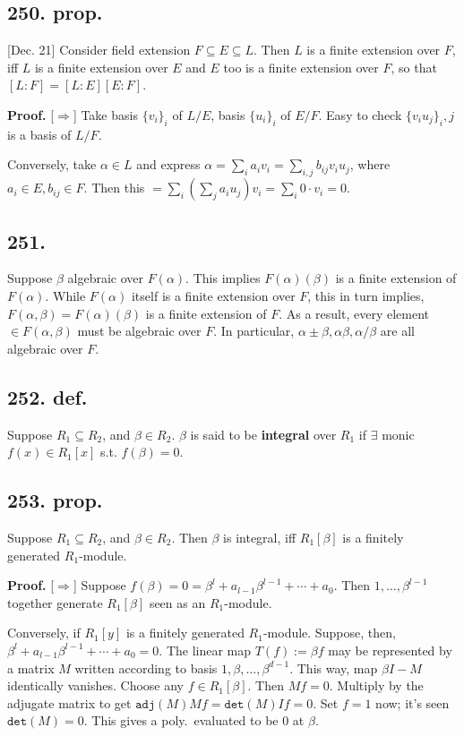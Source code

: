 \documentclass[12pt]{article}
\newcommand\aG\alpha \newcommand\bG\beta  \newcommand\gG\gamma \newcommand\dG\delta \newcommand\eG\varepsilon \newcommand\zG\zeta \newcommand\tG\vartheta \newcommand\kG\kappa \newcommand\lG\lambda \newcommand\sG\sigma \newcommand\fG\varphi \newcommand\oG\omega
\newcommand{\M}\cdot%
\newcommand{\Ex}\exists%
\newcommand{\Ip}{\Rightarrow} %
\newcommand{\Rb}[1]{ \left( #1 \right) }%
\newcommand{\Ss}[1]{\textsf{\bfseries{#1}}}%
\newcommand{\Tw}[1]{\texttt{#1}}%
\begin{document}
\subsection*{250. prop.} [Dec. 21] Consider field extension \(F \subseteq E \subseteq L\). 
Then \(L\) is a finite extension over \(F\), iff \(L\) is a finite extension over \(E\) and \(E\) too is a finite extension over \(F\), so that \([L:F] =[L:E] [E:F]\). \par
\Ss{Proof.} [\(\Ip\)] Take basis \(\{v_i\}_i\) of \(L/E\), basis \(\{u_i\}_i\) of \(E/F\). 
Easy to check \(\{v_i u_j\}_i,j\) is a basis of \(L/F\). \par
[\(\Leftarrow\)] Conversely, take \(\aG \in L\) and express \(\aG =\sum_i a_i v_i = \sum_{i,j} b_{ij} v_i u_j\), where \(a_i \in E, b_{ij} \in F\). 
Then this \(=\sum_i \Rb{\sum_j a_i u_j} v_i =\sum_i 0 \M v_i =0\). 

\subsection*{251.} Suppose \(\bG\) algebraic over \(F(\aG)\). 
This implies \(F(\aG)(\bG)\) is a finite extension of \(F(\aG)\). 
While \(F(\aG)\) itself is a finite extension over \(F\), this in turn implies, \(F(\aG,\bG) =F(\aG)(\bG)\) is a finite extension of \(F\). 
As a result, every element \(\in F(\aG,\bG)\) must be algebraic over \(F\). 
In particular, \(\aG \pm \bG, \aG\bG, \aG/\bG\) are all algebraic over \(F\). 

\subsection*{252. def.} Suppose \(R_1 \subseteq R_2\), and \(\bG \in R_2\). 
\(\bG\) is said to be \Ss{integral} over \(R_1\) if \(\Ex\) monic \(f(x) \in R_1 [x]\) s.t. \(f(\bG) =0\). 

\subsection*{253. prop.} Suppose \(R_1 \subseteq R_2\), and \(\bG \in R_2\). 
Then \(\bG\) is integral, iff \(R_1[\bG]\) is a finitely generated \(R_1\)-module. \par
\Ss{Proof.} [\(\Ip\)] Suppose \(f(\bG) =0 =\bG^l +a_{l-1} \bG^{l-1} +\dotsb+ a_0\). 
Then \(1,\dotsc,\bG^{l-1}\) together generate \(R_1[\bG]\) seen as an \(R_1\)-module. \par
[\(\Leftarrow\)] Conversely, if \(R_1[y]\) is a finitely generated \(R_1\)-module. 
Suppose, then, \(\bG^l +a_{l-1} \bG^{l-1} +\dotsb+ a_0 =0\). 
The linear map \(T(f) :=\bG f\) may be represented by a matrix \(M\) written according to basis \(1,\bG,\dotsc,\bG^{d-1}\). 
This way, map \(\bG I -M\) identically vanishes. 
Choose any \(f \in R_1[\bG]\). Then \(Mf =0\). 
Multiply by the adjugate matrix to get \(\Tw{adj}(M)Mf =\Tw{det}(M)If =0\). 
Set \(f=1\) now; it's seen \(\Tw{det}(M) =0\). This gives a poly.\ evaluated to be 0 at \(\bG\). 
\end{document}
